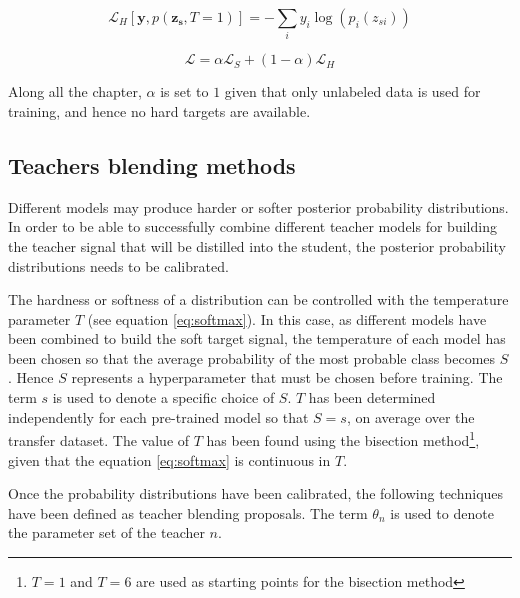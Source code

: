  \begin{equation}
 \mathcal{L}_{H}\left[\mathbf{y}, p(\mathbf{z_s}, T=1) \right] = -\sum_i y_i \log \left(p_i(z_{si})\right)
 \label{eq:ces}
 \end{equation}

 \begin{equation}
 \mathcal{L} = \alpha \mathcal{L}_S + (1-\alpha) \mathcal{L}_{H}
 \label{eq:loss_distillation}
 \end{equation}

Along all the chapter, $\alpha$ is set to $1$ given that only unlabeled data is used for training, and hence no hard targets are available.

 \subsection{Teachers blending methods} \label{sec:distillation_teachers_comb}
  Different models may produce harder or softer posterior probability distributions. In order to be able to successfully combine different teacher models for building the teacher signal that will be distilled into the student, the posterior probability distributions needs to be calibrated.

  The hardness or softness of a distribution can be controlled with the temperature parameter $T$ (see equation \ref{eq:softmax}). In this case, as different models have been combined to build the soft target signal, the temperature of each model has been chosen so that the average probability of the most probable class becomes $S$. Hence $S$ represents a hyperparameter that must be chosen before training. The term $s$ is used to denote a specific choice of $S$.  $T$ has been determined independently for each pre-trained model so that $S=s$, on average over the transfer dataset. The value of $T$ has been found using the bisection method\footnote{$T=1$ and $T=6$ are used as starting points for the bisection method}, given that the equation \ref{eq:softmax} is continuous in $T$.

  Once the probability distributions have been calibrated, the following techniques have been defined as teacher blending proposals. The term $\theta_n$ is used to denote the parameter set of the teacher $n$. 

